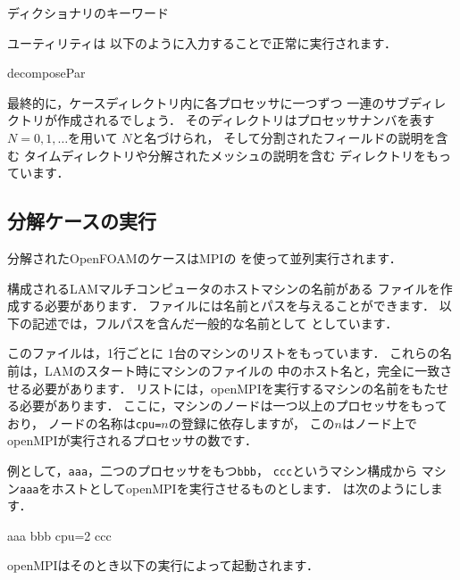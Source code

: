 \begin{table}[ht]
 
 \caption{ディクショナリのキーワード}
 \label{tbl:3.4}
\end{table}


%
%
ユーティリティは
以下のように入力することで正常に実行されます．
\begin{OFverbatim}[terminal]
decomposePar
\end{OFverbatim}
最終的に，ケースディレクトリ内に各プロセッサに一つずつ
一連のサブディレクトリが作成されるでしょう．
そのディレクトリはプロセッサナンバを表す$N = 0, 1, \ldots$を用いて
%
%
$N$と名づけられ，
そして分割されたフィールドの説明を含む
タイムディレクトリや分解されたメッシュの説明を含む
ディレクトリをもっています．


\subsection{分解ケースの実行}
\label{ssec:3.4.2}
分解されたOpenFOAMのケースはMPIの
%
%
%
%
を使って並列実行されます．

構成されるLAMマルチコンピュータのホストマシンの名前がある
ファイルを作成する必要があります．
ファイルには名前とパスを与えることができます．
以下の記述では，フルパスを含んだ一般的な名前として
としています．

このファイルは，1行ごとに
1台のマシンのリストをもっています．
これらの名前は，LAMのスタート時にマシンのファイルの
中のホスト名と，完全に一致させる必要があります．
リストには，openMPIを実行するマシンの名前をもたせる必要があります．
ここに，マシンのノードは一つ以上のプロセッサをもっており，
ノードの名称は\texttt{cpu=}$n$の登録に依存しますが，
この$n$はノード上でopenMPIが実行されるプロセッサの数です．

例として，\texttt{aaa}，二つのプロセッサをもつ\texttt{bbb}，
\texttt{ccc}というマシン構成から
マシン\texttt{aaa}をホストとしてopenMPIを実行させるものとします．
は次のようにします．
\begin{OFverbatim}[leftskip=3em]
aaa
bbb cpu=2
ccc
\end{OFverbatim}
openMPIはそのとき以下の実行によって起動されます．

